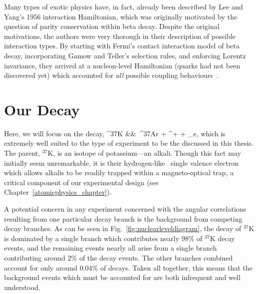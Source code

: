 Many types of exotic physics have, in fact, already been described by Lee and Yang's 1956 interaction Hamiltonian, which was originally motivated by the question of parity conservation within beta decay\cite{LeeYang}.  Despite the original motivations, the authors were very thorough in their description of possible interaction types.  By starting with Fermi's contact interaction model of beta decay, incorporating Gamow and Teller's selection rules, and enforcing Lorentz invariance, they arrived at a nucleon-level Hamiltonian (quarks had not been discovered yet) which accounted for \emph{all} possible coupling behaviours~\cite{GamowTeller}. 







\section{Our Decay}
Here, we will focus on the decay,
\bea
^{37}\textrm{K} &\rightarrow& \,^{37}\textrm{\!Ar} + \beta^{+} + \nu_e, 
\label{eq:ourdecay}
\eea
which is extremely well suited to the type of experiment to be the discussed in this thesis.  
The parent, $^{37}\textrm{K}$, is an isotope of potassium---an alkali.  Though this fact may initially seem unremarkable, it is their hydrogen-like~ single valence electron which allows alkalis to be readily trapped within a magneto-optical trap, a critical component of our experimental design (see Chapter~\ref{atomicphysics_chapter}).

A potential concern in any experiment concerned with the angular correlations resulting from one particular decay branch is the background from competing decay branches.  As can be seen in Fig.~\ref{fig:nuclearleveldiagram}, the decay of $^{37}\textrm{K}$ is dominated by a single branch which contributes nearly $98\%$ of $^{37}\textrm{K}$ decay events, and the remaining events nearly all arise from a single branch contributing around $2\%$ of the decay events.  The other branches combined account for only around $0.04\%$ of decays.  Taken all together, this means that the background events which must be accounted for are both infrequent and well understood.

